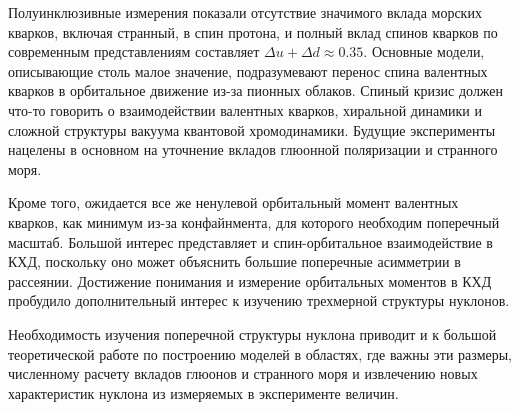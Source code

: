 \documentclass[
	a4paper, 10pt,
	twocolumn
]{article}
\begin{document}
Полуинклюзивные измерения показали отсутствие значимого вклада морских кварков, включая странный, в спин протона, и полный вклад спинов кварков по современным представлениям составляет $\Delta u + \Delta d \approx 0.35$. Основные модели, описывающие столь малое значение, подразумевают перенос спина валентных кварков в орбитальное движение из-за пионных облаков. Спиный кризис должен что-то говорить о взаимодействии валентных кварков, хиральной динамики и сложной структуры вакуума квантовой хромодинамики. Будущие эксперименты нацелены в основном на уточнение вкладов глюонной поляризации и странного моря. 

Кроме того, ожидается все же ненулевой орбитальный момент валентных кварков, как минимум из-за конфайнмента, для которого необходим поперечный масштаб. Большой интерес представляет и спин-орбитальное взаимодействие в КХД, поскольку оно может объяснить большие поперечные асимметрии в рассеянии. Достижение понимания и измерение орбитальных моментов в КХД пробудило дополнительный интерес к изучению трехмерной структуры нуклонов.

Необходимость изучения поперечной структуры нуклона приводит и к большой теоретической работе по построению моделей в областях, где важны эти размеры, численному расчету вкладов глюонов и странного моря и извлечению новых характеристик нуклона из измеряемых в эксперименте величин. 









\end{document}
